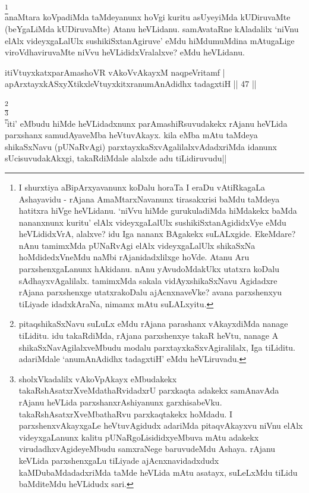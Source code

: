 \begin{artha}
\footnote[1]{I shurxtiya aBipArxyavanunx koDalu horaTa I eraDu 
vAtiRkagaLa Ashayavidu - rAjana AmaMtarxNavanunx tirasakxrisi baMdu 
taMdeya hatitxra hiVge heVLidanu. `niVvu hiMde gurukuladiMda hiMdakekx 
baMda nananxnunx kuritu' elAlx videyxgaLalUlx sushikiSxtanAgididxVye 
eMdu heVLididxVrA, alalxve? idu Iga nananx BAgakekx suLALxgide. 
EkeMdare? nAnu tamimxMda pUNaRvAgi elAlx videyxgaLalUlx shikaSxNa 
hoMdidedxVneMdu naMbi rAjanidadxlilxge hoVde. Atanu Aru 
parxshenxgaLanunx hAkidanu. nAnu yAvudoMdakUkx utatxra koDalu 
sAdhayxvAgalilalx. tamimxMda sakala vidAyxshikaSxNavu Agidadxre rAjana 
parxshenxge utatxrakoDalu ajAcnxnaveVke? avana parxshenxyu tiLiyade 
idadxkAraNa, nimamx mAtu suLALxyitu.}\\
anaMtara koVpadiMda taMdeyanunx hoVgi kuritu asUyeyiMda kUDiruvaMte 
(beYgaLiMda kUDiruvaMte) Atanu heVLidanu. samAvataRne kAladalilx 
`niVnu elAlx videyxgaLalUlx sushikiSxtanAgiruve' eMdu hiMdumuMdina 
mAtugaLige viroVdhaviruvaMte niVvu heVLididxVralalxve? eMdu heVLidanu.
\end{artha}


\begin{shl}
itiVtuyxkatxparAmashoVR vAkoVvAkayxM naqpeVritamf | \\
apArxtayxkASxyXtikxleVtuyxkitxranumAnAdidhx tadagxtiH \hfill|| 47 || 
\end{shl}

\begin{artha}
\footnote[2]{pitaqshikaSxNavu suLuLx eMdu rAjana parashanx vAkayxdiMda 
nanage tiLiditu. idu takaRdiMda, rAjana parxshenxye takaR heVtu, 
nanage A shikaSxNavAgilalxveMbudu modalu parxtayxkaSxvAgiralilalx, Iga 
tiLiditu. adariMdale `anumAnAdidhx tadagxtiH' eMdu heVLiruvadu.}\\
\footnote[3]{sholxVkadalilx vAkoVpAkayx eMbudakekx 
takaRshAsatxrXveMdathaRvidadxrU parxkaqta adakekx samAnavAda rAjanu 
heVLida parxshanxrAshiyanunx garxhisabeVku. takaRshAsatxrXveMbathaRvu 
parxkaqtakekx hoMdadu. I parxshenxvAkayxgaLe heVtuvAgidudx adariMda 
pitaqvAkayxvu niVnu elAlx videyxgaLanunx kalitu 
pUNaRgoLisididxyeMbuva mAtu adakekx virudadhxvAgideyeMbudu samxraNege 
baruvudeMdu Ashaya. rAjanu keVLida parxshenxgaLu tiLiyade 
ajAcnxnavidadxdudx kaMDubaMdadadxriMda taMde heVLida mAtu asatayx, 
suLeLxMdu tiLidu baMditeMdu heVLidudx sari.}\\
`iti' eMbudu hiMde heVLidadxnunx parAmashiRsuvudakekx rAjanu heVLida 
parxshanx samudAyaveMba heVtuvAkayx. kila eMba mAtu taMdeya 
shikaSxNavu (pUNaRvAgi) parxtayxkaSxvAgalilalxvAdadxriMda idanunx 
sUcisuvudakAkxgi, takaRdiMdale alalxde adu tiLidiruvudu||
\end{artha}

